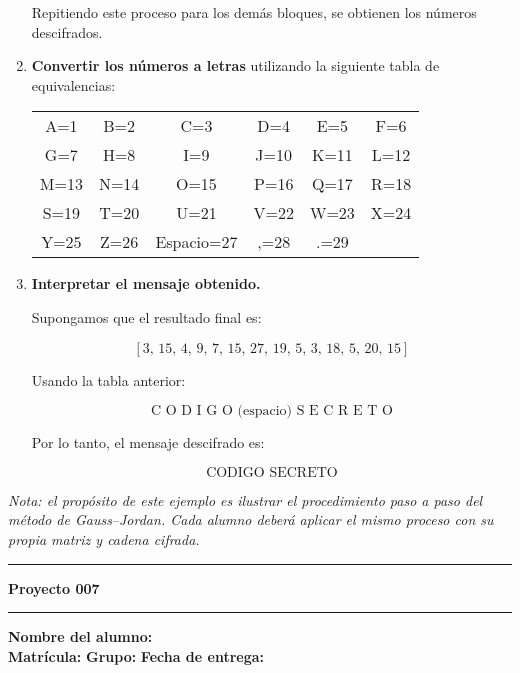 \documentclass{article}%
\begin{document}
\begin{enumerate}
    Repitiendo este proceso para los demás bloques, se obtienen los números descifrados.

    \item \textbf{Convertir los números a letras} utilizando la siguiente tabla de equivalencias:

    \begin{center}
    \renewcommand{\arraystretch}{1.2}
    \small
    \begin{tabular}{cccccc}
    A=1 & B=2 & C=3 & D=4 & E=5 & F=6 \\
    G=7 & H=8 & I=9 & J=10 & K=11 & L=12 \\
    M=13 & N=14 & O=15 & P=16 & Q=17 & R=18 \\
    S=19 & T=20 & U=21 & V=22 & W=23 & X=24 \\
    Y=25 & Z=26 & Espacio=27 & ,=28 & .=29 &
    \end{tabular}
    \end{center}

    \item \textbf{Interpretar el mensaje obtenido.}

    Supongamos que el resultado final es:

    \[
    [3,\, 15,\, 4,\, 9,\, 7,\, 15,\, 27,\, 19,\, 5,\, 3,\, 18,\, 5,\, 20,\, 15]
    \]

    Usando la tabla anterior:

    \[
    \text{C O D I G O (espacio) S E C R E T O}
    \]

    Por lo tanto, el mensaje descifrado es:

    \[
    \boxed{\text{CODIGO SECRETO}}
    \]
\end{enumerate}

\bigskip
\textit{Nota: el propósito de este ejemplo es ilustrar el procedimiento paso a paso del método de Gauss–Jordan.
Cada alumno deberá aplicar el mismo proceso con su propia matriz y cadena cifrada.}

\bigskip
\hrule
\bigskip%

\newpage
\vspace{0.5em}
\noindent\textbf{Proyecto 007}\\%
\noindent\hrule
\vspace{1em}

\noindent\textbf{Nombre del alumno:} \underline{\hspace{11.8cm}}\\[8pt]
\noindent\textbf{Matrícula:} \underline{\hspace{4cm}} 
\textbf{Grupo:} \underline{\hspace{1.9cm}}
\textbf{Fecha de entrega:} \underline{\hspace{2.5cm}}\\[12pt]
\end{document}

